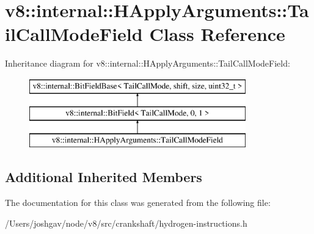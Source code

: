 \hypertarget{classv8_1_1internal_1_1_h_apply_arguments_1_1_tail_call_mode_field}{}\section{v8\+:\+:internal\+:\+:H\+Apply\+Arguments\+:\+:Tail\+Call\+Mode\+Field Class Reference}
\label{classv8_1_1internal_1_1_h_apply_arguments_1_1_tail_call_mode_field}
Inheritance diagram for v8\+:\+:internal\+:\+:H\+Apply\+Arguments\+:\+:Tail\+Call\+Mode\+Field\+:\begin{figure}[H]
\begin{center}
\leavevmode
\includegraphics[height=3.000000cm]{classv8_1_1internal_1_1_h_apply_arguments_1_1_tail_call_mode_field}
\end{center}
\end{figure}
\subsection*{Additional Inherited Members}


The documentation for this class was generated from the following file\+:\begin{DoxyCompactItemize}
\item 
/\+Users/joshgav/node/v8/src/crankshaft/hydrogen-\/instructions.\+h\end{DoxyCompactItemize}
